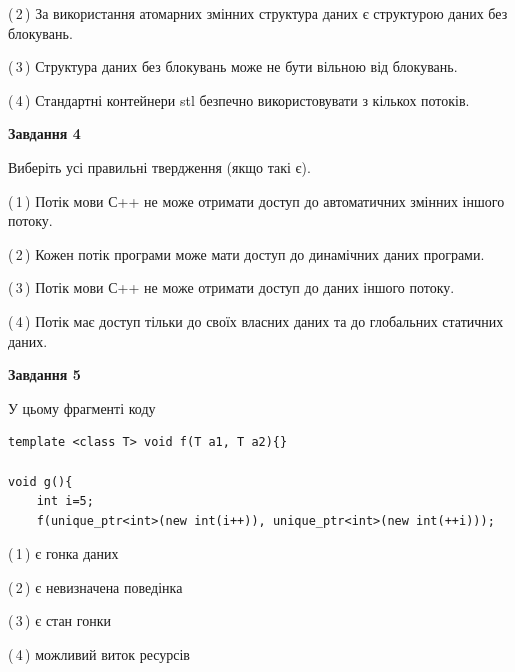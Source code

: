\documentclass[12pt, ukrainian]{article}
\begin{document}
\begin {large}
{(\,2\,) За використання атомарних змінних структура даних є структурою даних без блокувань.%

(\,3\,) Структура даних без блокувань може не бути вільною від блокувань.%

(\,4\,) Стандартні контейнери stl безпечно використовувати з кількох потоків.%



\begin{center}
\textbf{Завдання 4}
\end{center}
Виберіть усі правильні твердження (якщо такі є).\par
\vspace{2mm}

(\,1\,) Потік мови С++ не може отримати доступ до автоматичних змінних іншого потоку.%

(\,2\,) Кожен потік програми може мати доступ до динамічних даних програми.%

(\,3\,) Потік мови С++ не може отримати доступ до даних іншого потоку.%

(\,4\,) Потік має доступ тільки до своїх власних даних та до глобальних статичних даних.%



\begin{center}
\textbf{Завдання 5}
\end{center}
У цьому фрагменті коду
\begin{verbatim}
template <class T> void f(T a1, T a2){}

void g(){
    int i=5;
    f(unique_ptr<int>(new int(i++)), unique_ptr<int>(new int(++i)));
\end{verbatim}

(\,1\,) є гонка даних%

(\,2\,) є невизначена поведінка%

(\,3\,) є стан гонки%

(\,4\,) можливий виток ресурсів%


}
\end {large}
\end{document}
